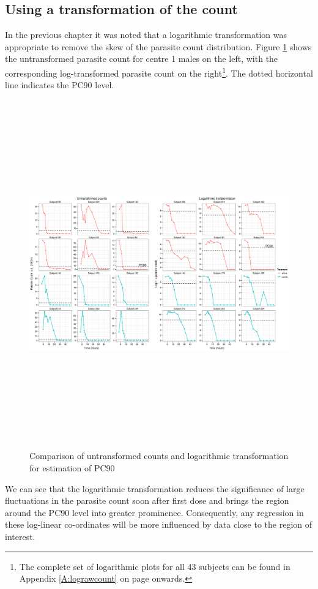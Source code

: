 \subsection{Using a transformation of the count}
In the previous chapter it was noted that a logarithmic transformation was appropriate to remove the skew of the parasite count distribution. Figure \ref{comprawlog} shows the untransformed parasite count for centre 1 males on the left, with the corresponding log-transformed parasite count on the right\footnote{The complete set of logarithmic plots for all 43 subjects can be found in Appendix \ref{A:lograwcount} on page \pageref{A:lograwcount} onwards.}. The dotted horizontal line indicates the PC90 level. 
\begin{figure}
\begin{center}
\includegraphics[height=150mm]{comprawlog90.eps}
\caption{Comparison of untransformed counts and logarithmic transformation for estimation of PC90}
\label{comprawlog}
\end{center}
\end{figure}

We can see that the logarithmic transformation reduces the significance of large fluctuations in the parasite count soon after first dose and brings the region around the PC90 level into greater prominence. Consequently, any regression in these log-linear co-ordinates will be more influenced by data close to the region of interest.  

